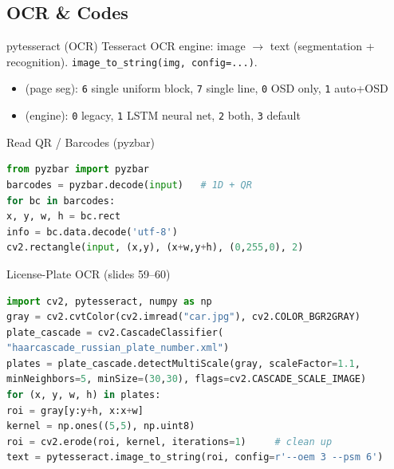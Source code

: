 \subsection{OCR \& Codes}


\begin{definition}{pytesseract (OCR)}
    Tesseract OCR engine: image $\to$ text (segmentation + recognition).
    \texttt{image\_to\_string(img, config=...)}.
    \begin{itemize}
        \item {} (page seg): \texttt{6} single uniform block,
              \texttt{7} single line, \texttt{0} OSD only, \texttt{1} auto+OSD
        \item {} (engine): \texttt{0} legacy, \texttt{1} LSTM neural net,
              \texttt{2} both, \texttt{3} default
    \end{itemize}
\end{definition}

\begin{KR}{Read QR / Barcodes (pyzbar)}
\begin{lstlisting}[language=Python, style=basesmol, aboveskip=2pt, belowskip=1pt]
from pyzbar import pyzbar
barcodes = pyzbar.decode(input)   # 1D + QR
for bc in barcodes:
x, y, w, h = bc.rect
info = bc.data.decode('utf-8')
cv2.rectangle(input, (x,y), (x+w,y+h), (0,255,0), 2)
\end{lstlisting}
\end{KR}

\multend

\begin{examplecode}{License-Plate OCR (slides 59--60)}
\begin{lstlisting}[language=Python, style=basesmol, aboveskip=2pt, belowskip=2pt]
import cv2, pytesseract, numpy as np
gray = cv2.cvtColor(cv2.imread("car.jpg"), cv2.COLOR_BGR2GRAY)
plate_cascade = cv2.CascadeClassifier(
"haarcascade_russian_plate_number.xml")
plates = plate_cascade.detectMultiScale(gray, scaleFactor=1.1,
minNeighbors=5, minSize=(30,30), flags=cv2.CASCADE_SCALE_IMAGE)
for (x, y, w, h) in plates:
roi = gray[y:y+h, x:x+w]
kernel = np.ones((5,5), np.uint8)
roi = cv2.erode(roi, kernel, iterations=1)     # clean up
text = pytesseract.image_to_string(roi, config=r'--oem 3 --psm 6')
\end{lstlisting}
\end{examplecode}

\raggedcolumns
